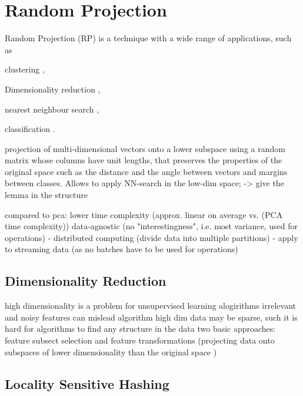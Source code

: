 \section{Random Projection}


Random Projection (RP) is a technique with a wide range of applications, such as

clustering \cite{fern2003random}, 

Dimensionality reduction \cite{bingham2001random},

nearest neighbour search \cite{charikar2002similarity}, 

classification \cite{blum2005random}.

projection of multi-dimensional vectors onto a lower subspace using  a random matrix whose columns have unit lengths, that preserves the properties of the original space such as the distance and the angle between vectors and margins between classes. 
Allows to apply NN-search in the low-dim space; -> give the lemma in the structure

compared to pca:
 lower time complexity (approx. linear on average vs. (PCA time complexity))
 data-agnostic (no "interestingness", i.e. most variance, used for operations)
    - distributed computing (divide data into multiple partitions)
    - apply to streaming data (as no batches have to be used for operations)





\subsection{Dimensionality Reduction}
high dimensionality is a problem for unsupervised learning alogirithms
irrelevant and noisy features can mislead algorithm
high dim data may be sparse, such it is hard for algorithms to find any structure in the data
    two basic approaches: feature subsect selection \cite{dy2000feature} and feature transformations (projecting data onto subspaces of lower dimensionality than the original space \cite[374 ff.]{james2013introduction})





\subsection{Locality Sensitive Hashing}

